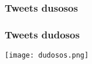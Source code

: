 \subsubsection{Tweets dusosos}
\begin{frame}
    \frametitle{Tweets dudosos}

    \begin{center}
        \texttt{[image: dudosos.png]}
    \end{center}
\end{frame}
